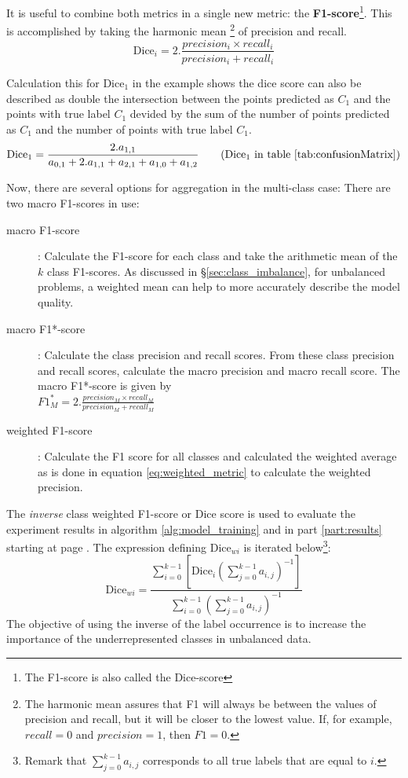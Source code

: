 \par{It is useful to combine both metrics in a single new metric: the \textbf{F1-score}\footnote{The F1-score is also called the Dice-score}. This is accomplished by taking the harmonic mean
\footnote{The harmonic mean assures that F1 will always be between the values of precision and recall, but it will be closer to the lowest value. If, for example, $recall=0$ and $precision=1$, then $F1=0$.} of precision and recall.
\begin{equation}
    \text{Dice}_i = 2 . \frac{precision_i \times recall_i }{precision_i + recall_i }
\end{equation}
}
\par{
    Calculation this for Dice$_1$ in the example shows the dice score can also be described as double the intersection 
    between the points predicted as $C_1$ and the points with true label $C_1$ devided by the sum of the number of points predicted as $C_1$ and the number of points with true label $C_1$.
    \begin{equation}
        \text{Dice}_1 = \frac{2.a_{1,1}}{a_{0,1} + 2.a_{1,1} + a_{2, 1} + a_{1,0} + a_{1,2}} \tag{Dice$_1$ in table \ref{tab:confusionMatrix}}
    \end{equation}
}
\par{
    Now, there are several options for aggregation in the multi-class case:
    There are two macro F1-scores in use:
    \begin{description}
        \item[macro F1-score]: Calculate the F1-score for each class and take the arithmetic mean of the $k$ class F1-scores. As discussed in §\ref{sec:class_imbalance}, for unbalanced problems, a weighted mean can help to more accurately describe the model quality.
        \item[macro F1*-score]: Calculate the class precision and recall scores. From these class precision and recall scores, calculate the macro precision and macro recall score. 
        The macro F1*-score is given by\\ $F1_M^*=2 . \frac{precision_M \times recall_M }{precision_M + recall_M }$
        \item[weighted F1-score]: Calculate the F1 score for all classes and calculated the weighted average as is done in equation \ref{eq:weighted_metric} to calculate the weighted precision.
    \end{description}
}
The \textit{inverse} class weighted F1-score or Dice score is used to evaluate the experiment results in algorithm \ref{alg:model_training} and in part \ref{part:results} starting at page \pageref{part:results}.
The expression defining $\text{Dice}_{wi}$ is iterated below\footnote{Remark that $\sum_{j=0}^{k-1} a_{i,j}$ corresponds to all true labels that are equal to $i$.}:
\begin{equation}
    \text{Dice}_{wi} = \frac{\sum_{i=0}^{k-1} \left[ \text{Dice}_i \left( \sum_{j=0}^{k-1} a_{i,j} \right)^{-1} \right] }{\sum_{i=0}^{k-1} \left(\sum_{j=0}^{k-1} a_{i,j} \right)^{-1}} \label{eq:weighted_dice}
\end{equation}
The objective of using the inverse of the label occurrence is to increase the importance of the underrepresented classes in unbalanced data.

